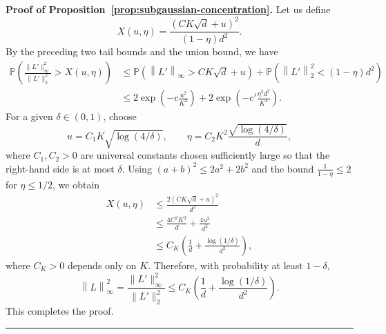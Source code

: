 \documentclass[superscriptaddress,amsmath,amssymb,aps,pra,letterpaper,tightenlines,notitlepages,12pt]{revtex4-2}
\newenvironment{proof}[1][Proof]{\noindent\textbf{#1.} }{\ \rule{0.5em}{0.5em}}
\begin{document}
\begin{proof}[Proof of Proposition~\ref{prop:subgaussian-concentration}]
    Let us define
    \begin{equation}
        X(u,\eta)=\frac{(CK\sqrt d+u)^2}{(1-\eta)d^2}.
    \end{equation}
    By the preceding two tail bounds and the union bound, we have
    \begin{align}
        \mathbb{P}\!\left(\frac{\|L'\|_\infty^2}{\|L'\|_2^2} > X(u,\eta)\right)
        &\leq \mathbb{P}\!\left(\left\|L'\right\|_\infty > CK\sqrt d+u\right)+
        \mathbb{P}\!\left(\left\|L'\right\|_2^2 < (1-\eta)d^2\right)\nonumber\\
        &\le 2\exp\!\left(-c\frac{u^2}{K^2}\right)+ 2\exp\!\left(-c'\frac{\eta^2d^2}{K^4}\right).
    \end{align}
    For a given $\delta \in (0,1)$, choose
    \begin{equation}
        u = C_1 K \sqrt{\log(4/\delta)}, \qquad
        \eta = C_2 K^2 \frac{\sqrt{\log(4/\delta)}}{d},
    \end{equation}
    where $C_1,C_2>0$ are universal constants chosen sufficiently large so that the right-hand side is at most $\delta$.
    Using $(a+b)^2 \le 2a^2 + 2b^2$ and the bound $\frac{1}{1-\eta} \le 2$ for $\eta \le 1/2$, we obtain
    \begin{align}    
        X(u,\eta) &\le \frac{2(CK\sqrt d+u)^2}{d^2}\\
        &\le \frac{4C^2K^2}{d}+\frac{4u^2}{d^2}\\
        &\le C_K \left( \frac{1}{d} + \frac{\log(1/\delta)}{d^2} \right),
    \end{align}
    where $C_K>0$ depends only on $K$.
    Therefore, with probability at least $1-\delta$,
    \begin{equation}
        \left\|L\right\|_\infty^2=\frac{\|L'\|_\infty^2}{\|L'\|_2^2}
        \le C_K\left(\frac{1}{d}+\frac{\log(1/\delta)}{d^2}\right).
    \end{equation}
    This completes the proof.
\end{proof}
\end{document}
